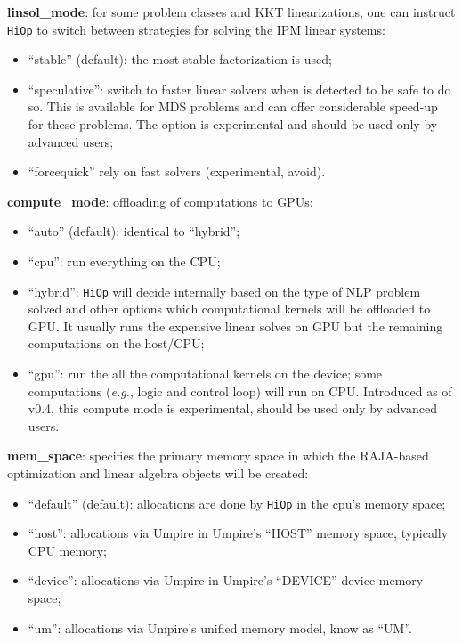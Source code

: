 \documentclass[11pt]{article}
\newcounter{line}
\newcommand{\Hi}{\texttt{HiOp}\xspace}
\begin{document}
\medskip

\noindent \textbf{linsol\_mode}: for some problem classes and KKT linearizations, one can instruct \Hi to switch between strategies for solving the IPM linear systems:
\begin{itemize}
\item ``stable'' (default): the most stable factorization is used;
\item ``speculative'': switch to faster linear solvers when is detected to be safe to do so. This is available for MDS problems and can offer considerable speed-up for these problems. The option is experimental and should be used only by advanced users;
\item ``forcequick'' rely on fast solvers (experimental, avoid).
\end{itemize}

\medskip

\noindent \textbf{compute\_mode}: offloading of computations to GPUs:
\begin{itemize}
\item ``auto'' (default): identical to ``hybrid'';
\item ``cpu'': run everything on the CPU;
\item ``hybrid'':  \Hi will decide internally based on the type of NLP problem solved and other options which computational kernels will be offloaded to GPU. It usually runs the expensive linear solves on GPU but the remaining computations on the host/CPU;
\item ``gpu'': run the all the computational kernels on the device; some computations (\textit{e.g.}, logic and control loop) will run on CPU. Introduced as of v0.4, this compute mode is experimental, should be used only by advanced users.
\end{itemize}

\medskip


\noindent \textbf{mem\_space}: specifies the primary memory space in which the RAJA-based optimization and linear algebra objects will be created:
\begin{itemize}
\item ``default'' (default): allocations are done by \Hi in the cpu's memory space;
\item ``host'':  allocations via Umpire in Umpire's ``HOST'' memory space, typically CPU memory;
\item ``device'': allocations via Umpire in Umpire's ``DEVICE'' device memory space;
\item ``um'': allocations via Umpire's unified memory model, know as ``UM''.
\end{itemize}
\end{document}
